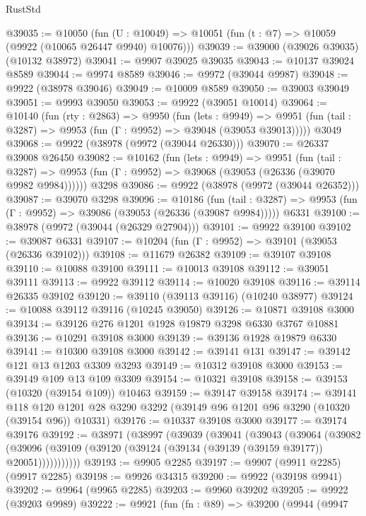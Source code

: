 \begin{lexlean}{RustStd}
\begin{coremodule}
@39035 := @10050
    (fun (U : @10049) => @10051 (fun (t : @7) => @10059 (@9922 (@10065 @26447 @9940) @10076)))
@39039 := @39000 (@39026 @39035) (@10132 @38972)
@39041 := @9907 @39025 @39035
@39043 := @10137 @39024 @8589
@39044 := @9974 @8589
@39046 := @9972 (@39044 @9987)
@39048 := @9922 (@38978 @39046)
@39049 := @10009 @8589
@39050 := @39003 @39049
@39051 := @9993 @39050
@39053 := @9922 (@39051 @10014)
@39064 := @10140
    (fun (rty : @2863) =>
    @9950
      (fun (lets : @9949) =>
      @9951 (fun (tail : @3287) => @9953 (fun (Γ : @9952) => @39048 (@39053 @39013)))))
    @3049
@39068 := @9922 (@38978 (@9972 (@39044 @26330)))
@39070 := @26337 @39008 @26450
@39082 := @10162
    (fun (lets : @9949) =>
    @9951
      (fun (tail : @3287) =>
      @9953 (fun (Γ : @9952) => @39068 (@39053 (@26336 (@39070 @9982 @9984))))))
    @3298
@39086 := @9922 (@38978 (@9972 (@39044 @26352)))
@39087 := @39070 @3298
@39096 := @10186
    (fun (tail : @3287) => @9953 (fun (Γ : @9952) => @39086 (@39053 (@26336 (@39087 @9984)))))
    @6331
@39100 := @38978 (@9972 (@39044 (@26329 @27904)))
@39101 := @9922 @39100
@39102 := @39087 @6331
@39107 := @10204 (fun (Γ : @9952) => @39101 (@39053 (@26336 @39102)))
@39108 := @11679 @26382
@39109 := @39107 @39108
@39110 := @10088 @39100
@39111 := @10013 @39108
@39112 := @39051 @39111
@39113 := @9922 @39112
@39114 := @10020 @39108
@39116 := @39114 @26335 @39102
@39120 := @39110 (@39113 @39116) (@10240 @38977)
@39124 := @10088 @39112 @39116 (@10245 @39050)
@39126 := @10871 @39108 @3000
@39134 := @39126 @276 @1201 @1928 @19879 @3298 @6330 @3767 @10881
@39136 := @10291 @39108 @3000
@39139 := @39136 @1928 @19879 @6330
@39141 := @10300 @39108 @3000
@39142 := @39141 @131
@39147 := @39142 @121 @13 @1203 @3309 @3293
@39149 := @10312 @39108 @3000
@39153 := @39149 @109 @13 @109 @3309
@39154 := @10321 @39108
@39158 := @39153 (@10320 (@39154 @109)) @10463
@39159 := @39147 @39158
@39174 := @39141
    @118
    @120
    @1201
    @28
    @3290
    @3292
    (@39149 @96 @1201 @96 @3290 (@10320 (@39154 @96)) @10331)
@39176 := @10337 @39108 @3000
@39177 := @39174 @39176
@39192 := @38971
    (@38997
      (@39039
        (@39041
          (@39043
            (@39064
              (@39082
                (@39096 (@39109 (@39120 (@39124 (@39134 (@39139 (@39159 @39177)) @20051)))))))))))
@39193 := @9905 @2285
@39197 := @9907 (@9911 @2285) (@9917 @2285)
@39198 := @9926 @34315
@39200 := @9922 (@39198 @9941)
@39202 := @9964 (@9965 @2285)
@39203 := @9960 @39202
@39205 := @9922 (@39203 @9989)
@39222 := @9921
    (fun (fn : @89) =>
    @39200
      (@9944
        (@9947

\end{coremodule}
\end{lexlean}

